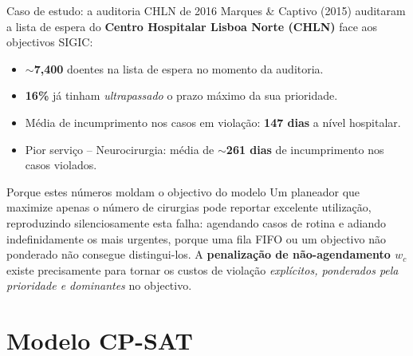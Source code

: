 \documentclass[10pt,aspectratio=169]{beamer}
\begin{document}
\begin{frame}{Caso de estudo: a auditoria CHLN de 2016}
  Marques \& Captivo (2015) auditaram a lista de espera do
  \textbf{Centro Hospitalar Lisboa Norte (CHLN)} face aos objectivos
  SIGIC:
  \begin{itemize}\small
    \item $\sim$\textbf{7{,}400} doentes na lista de espera no momento
      da auditoria.
    \item \textbf{16\%} j\'a tinham \emph{ultrapassado} o prazo m\'aximo
      da sua prioridade.
    \item M\'edia de incumprimento nos casos em viola\c{c}\~ao:
      \textbf{147 dias} a n\'ivel hospitalar.
    \item Pior servi\c{c}o -- Neurocirurgia: m\'edia de
      $\sim$\textbf{261 dias} de incumprimento nos casos violados.
  \end{itemize}
  \pause
  \begin{block}{Porque estes n\'umeros moldam o objectivo do modelo}
    Um planeador que maximize apenas o n\'umero de cirurgias pode
    reportar excelente utiliza\c{c}\~ao, reproduzindo silenciosamente
    esta falha: agendando casos de rotina e adiando indefinidamente os
    mais urgentes, porque uma fila FIFO ou um objectivo n\~ao ponderado
    n\~ao consegue distingui-los.
    A \textbf{penaliza\c{c}\~ao de n\~ao-agendamento $w_c$} existe
    precisamente para tornar os custos de viola\c{c}\~ao
    \emph{expl\'icitos, ponderados pela prioridade e dominantes}
    no objectivo.
  \end{block}
\end{frame}

\section{Modelo CP-SAT}
\end{document}

